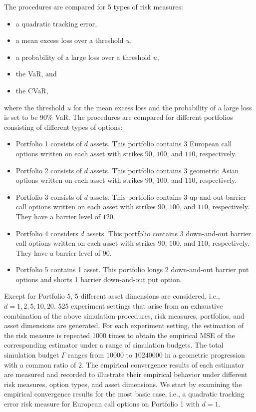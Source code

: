 The procedures are compared for 5 types of risk measures:
\begin{itemize}
    \item a quadratic tracking error,
    \item a mean excess loss over a threshold $u$,
    \item a probability of a large loss over a threshold $u$,
    \item the VaR, and
    \item the CVaR,
\end{itemize}
where the threshold $u$ for the mean excess loss and the probability of a large loss is set to be 90\% VaR.
The procedures are compared for different portfolios consisting of different types of options:
\begin{itemize}
    \item   Portfolio 1 consists of $d$ assets.
    This portfolio contains 3 European call options written on each asset with strikes $90$, $100$, and $110$, respectively. 
    \item   Portfolio 2 consists of $d$ assets.
    This portfolio contains 3 geometric Asian options written on each asset with strikes $90$, $100$, and $110$, respectively. 
    \item   Portfolio 3 consists of $d$ assets.
    This portfolio contains 3 up-and-out barrier call options written on each asset with strikes $90$, $100$, and $110$, respectively. They have a barrier level of $120$.
    \item   Portfolio 4 considers $d$ assets.
    This portfolio contains 3 down-and-out barrier call options written on each asset with strikes $90$, $100$, and $110$, respectively. They have a barrier level of $90$.
    \item   Portfolio 5 contains 1 asset.
    This portfolio longs 2 down-and-out barrier put options and shorts 1 barrier down-and-out put option. 
\end{itemize}
Except for Portfolio 5, 5 different asset dimensions are considered, i.e., $d = 1, 2, 5, 10, 20$.
525 experiment settings that arise from an exhaustive combination of the above simulation procedures, risk measures, portfolios, and asset dimensions are generated.
For each experiment setting, the estimation of the risk measure is repeated \num{1000} times to obtain the empirical MSE of the corresponding estimator under a range of simulation budgets.
The total simulation budget $\Gamma$ ranges from $\num{10000}$ to $\num{10240000}$ in a geometric progression with a common ratio of $2$.
The empirical convergence results of each estimator are measured and recorded to illustrate their empirical behavior under different risk measures, option types, and asset dimensions.
We start by examining the empirical convergence results for the most basic case, i.e., a quadratic tracking error risk measure for European call options on Portfolio 1 with $d = 1$.

